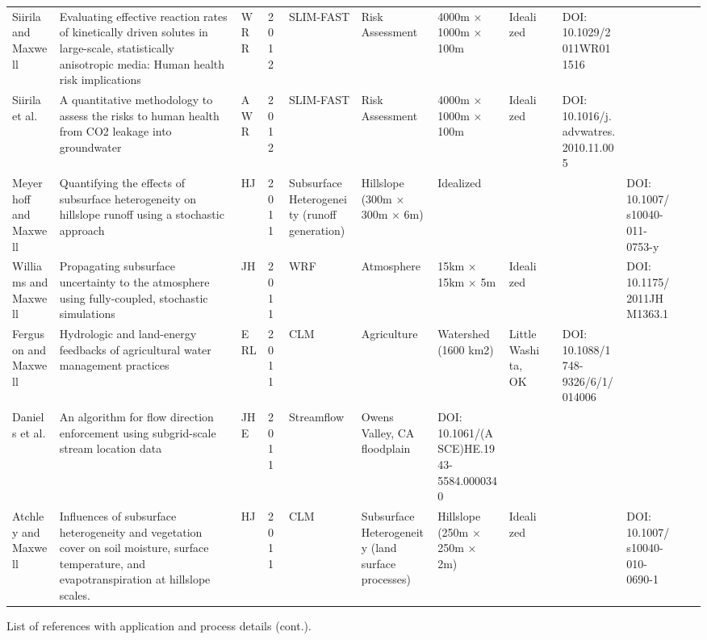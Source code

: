 {\begin{table}
\begin{tabular}{ p{1cm} p{2cm} p{0.75cm} p{0.5cm} p{1cm} p{1.5cm} p{1cm} p{1cm} p{0.25cm} p{0.25cm} p{0.25cm} p{0.25cm} p{1cm} }
Siirila and Maxwell & Evaluating effective reaction rates of kinetically driven solutes in large-scale, statistically anisotropic media: Human health risk implications & WRR & 2012 & SLIM-FAST & Risk Assessment & 4000m × 1000m × 100m & Idealized &  & DOI: 10.1029/2011WR011516  \\
Siirila et al. & A quantitative methodology to assess the risks to human health from CO2 leakage into groundwater & AWR & 2012 & SLIM-FAST & Risk Assessment & 4000m × 1000m × 100m & Idealized &  & DOI: 10.1016/j.advwatres.2010.11.005  \\
Meyerhoff and Maxwell & Quantifying the effects of subsurface heterogeneity on hillslope runoff using a stochastic approach & HJ & 2011 & Subsurface Heterogeneity (runoff generation) & Hillslope (300m × 300m × 6m) & Idealized &  &  &  & DOI: 10.1007/s10040-011-0753-y  \\
Williams and Maxwell & Propagating subsurface uncertainty to the atmosphere using fully-coupled, stochastic simulations & JH & 2011 & WRF & Atmosphere & 15km × 15km × 5m & Idealized &  &  & DOI: 10.1175/2011JHM1363.1 \\
Ferguson and Maxwell & Hydrologic and land-energy feedbacks of agricultural water management practices & ERL & 2011 & CLM & Agriculture & Watershed (1600 km2) & Little Washita, OK &  & DOI: 10.1088/1748-9326/6/1/014006 \\
Daniels et al. & An algorithm for flow direction enforcement using subgrid-scale stream location data & JHE & 2011 & Streamflow & Owens Valley, CA floodplain & DOI: 10.1061/(ASCE)HE.1943-5584.0000340 \\
Atchley and Maxwell & Influences of subsurface heterogeneity and vegetation cover on soil moisture, surface temperature, and evapotranspiration at hillslope scales. & HJ & 2011 & CLM & Subsurface Heterogeneity (land surface processes) & Hillslope (250m × 250m × 2m) & Idealized &  &  & DOI: 10.1007/s10040-010-0690-1  \\
\end{tabular}
\label{pfref2}
\end{table}

\begin{table} \center
\caption{List of \parflow{} references with application and process details (cont.).}


\end{table}}
